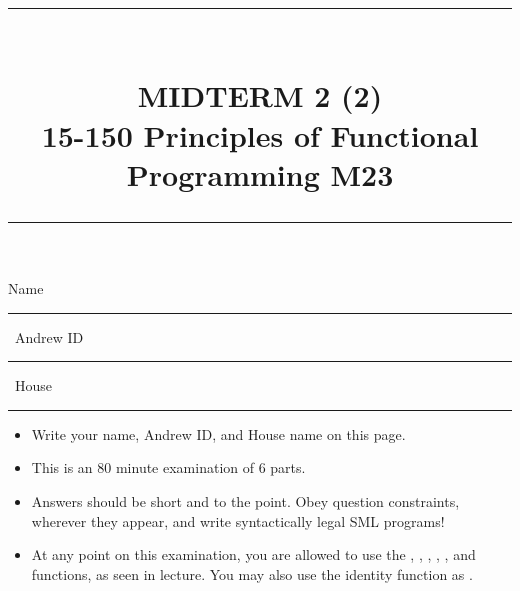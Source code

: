 \documentclass[addpoints,12pt]{exam}
\newcommand{\HRule}[1]{\rule{\linewidth}{#1}}
\begin{document}
\pagestyle{fancy}
\fancyhead{} %
\fancyfoot[C]{\thepage} %


\setlength{\droptitle}{-8em}   %

\title{ \normalsize \textsc{}
		\HRule{1.5pt} \\
		\large \textbf{
      \uppercase{Midterm 2 (2)} \\
      15-150 Principles of Functional Programming M23} \\
    \HRule{1.5pt}
    \date{}
}

\maketitle

\vspace{-3cm}

\hspace{-1cm} Name \rule{5cm}{0.4pt} \, Andrew ID \rule{3cm}{0.4pt} \, House \rule{3.5cm}{0.4pt}

\vspace{5pt}

\begin{itemize}
  \item Write your name, Andrew ID, and House name on this page.
  \item This is an 80 minute examination of 6 parts.
  \item Answers should be short and to the point. Obey question constraints, wherever
  they appear, and write syntactically legal SML programs!
  \item At any point on this examination, you are allowed to use the ,
  , , , , and \code{|>} functions,
  as seen in lecture. You may also use the identity function as .
\end{itemize}
\vspace{\fill}

{\small
\vqword{}
\begin{center}
\gradetable[v][questions]
\end{center}
}
\end{document}
